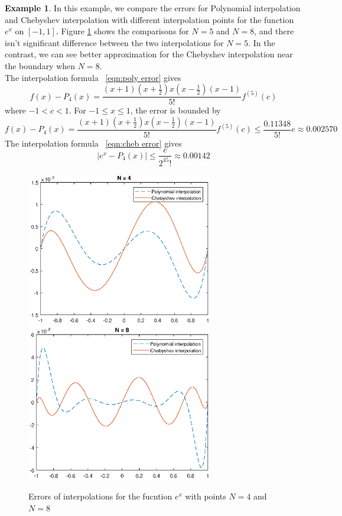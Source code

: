 \documentclass[11pt]{amsart}
\theoremstyle{definition}
\newtheorem{exmp}{Example}[section]
\begin{document}
\begin{exmp}
In this example, we compare the errors for Polynomial interpolation and Chebyshev interpolation with different interpolation points for the function $e^x$ on $[-1,1]$. Figure \ref{fig:e1} shows the comparisons for $N=5$ and $N=8$, and there isn't significant difference between the two interpolations for $N=5$. In the contrast, we can see better approximation for the Chebyshev interpolation near the boundary when  $N=8$.\\
The interpolation formula ~\eqref{eqn:poly error} gives 
\begin{equation}
f(x)-P_4(x)=\frac{(x+1)(x+\frac{1}{2})x(x-\frac{1}{2})(x-1)}{5!}f^{(5)}(c)
\end{equation}
where $-1<c<1$. For $-1\leq x\leq 1$, the error is bounded by
\begin{equation*}
f(x)-P_4(x)=\frac{(x+1)(x+\frac{1}{2})x(x-\frac{1}{2})(x-1)}{5!}f^{(5)}(c)\leq \frac{0.11348}{5!}e\approx 0.002570
\end{equation*}
The interpolation formula ~\eqref{eqn:cheb error} gives 
\begin{equation*}
|e^x-P_4(x)|\leq \frac{e}{2^45!}\approx 0.00142
\end{equation*}

\begin{figure}     	\centerline{\includegraphics[width=3.2in]{./figs/e1a.eps}
      	\hspace{-6pt}
     	\includegraphics[width=3.2in]{./figs/e1b.eps}}
     	\hspace{-6pt}
		\caption{Errors of interpolations for the fucntion $e^x$ with points $N=4$ and $N=8$}
        \label{fig:e1}
\end{figure}
\end{exmp}
\end{document}
